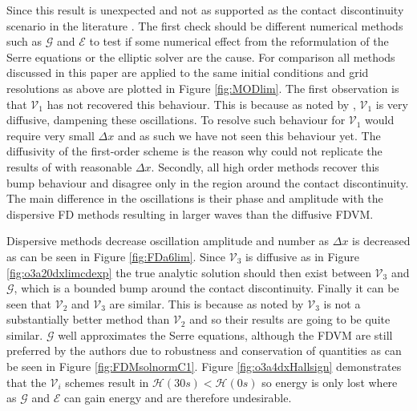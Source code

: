 \documentclass[SingleSpace,12pt,Proceedings]{Serre_ASCE}
\begin{document}
Since this result is unexpected and not as supported as the contact discontinuity scenario in the literature \cite{El-etal-2006,Gurevich-Meshcherkin-1984-1277}. The first check should be different numerical methods such as $\mathcal{G}$ and $\mathcal{E}$ to test if some numerical effect from the reformulation of the Serre equations or the elliptic solver are the cause. For comparison all methods discussed in this paper are applied to the same initial conditions and grid resolutions as above are plotted in Figure \ref{fig:MODlim}. The first observation is that $\mathcal{V}_1$ has not recovered this behaviour. This is because as noted by , $\mathcal{V}_1$ is very diffusive, dampening these oscillations. To resolve such behaviour for $\mathcal{V}_1$ would require very small $\Delta x$ and as such we have not seen this behaviour yet. The diffusivity of the first-order scheme is the reason why  could not replicate the results of  with reasonable $\Delta x$. Secondly, all high order methods recover this bump behaviour and disagree only in the region around the contact discontinuity. The main difference in the oscillations is their phase and amplitude with the dispersive FD methods resulting in larger waves than the diffusive FDVM. 

Dispersive methods decrease oscillation amplitude and number as $\Delta x$ is decreased as can be seen in Figure \ref{fig:FDa6lim}. Since $\mathcal{V}_3$ is diffusive as in Figure \ref{fig:o3a20dxlimcdexp} the true analytic solution should then exist between $\mathcal{V}_3$ and $\mathcal{G}$, which is a bounded bump around the contact discontinuity. Finally it can be seen that $\mathcal{V}_2$ and $\mathcal{V}_3$ are similar. This is because as noted by  $\mathcal{V}_3$ is not a substantially better method than $\mathcal{V}_2$ and so their results are going to be quite similar. $\mathcal{G}$ well approximates the Serre equations, although the FDVM are still preferred by the authors due to robustness and conservation of quantities as can be seen in Figure \ref{fig:FDMsolnormC1}. Figure \ref{fig:o3a4dxHallsign} demonstrates that the $\mathcal{V}_i$ schemes result in $\mathcal{H}(30s) < \mathcal{H}(0s)$ so energy is only lost where as $\mathcal{G}$ and $\mathcal{E}$ can gain energy and are therefore undesirable.
\end{document}

